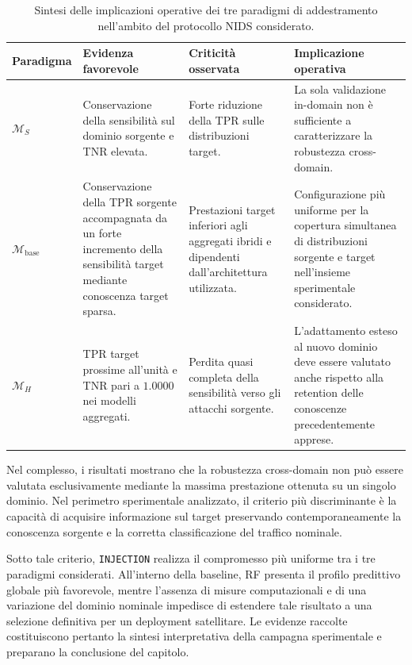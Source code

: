 \begin{table}[H]
    \centering
    \caption{Sintesi delle implicazioni operative dei tre paradigmi di addestramento nell'ambito del protocollo NIDS considerato.}
    \label{tab:cap5_operational_summary}
    \footnotesize
    \begin{tabularx}{\textwidth}{l >{\raggedright\arraybackslash}X >{\raggedright\arraybackslash}X >{\raggedright\arraybackslash}X}
        \toprule
        \textbf{Paradigma} & \textbf{Evidenza favorevole} & \textbf{Criticità osservata} & \textbf{Implicazione operativa} \\
        \midrule
        $\mathcal{M}_{S}$
        & Conservazione della sensibilità sul dominio sorgente e TNR elevata.
        & Forte riduzione della TPR sulle distribuzioni target.
        & La sola validazione in-domain non è sufficiente a caratterizzare la robustezza cross-domain. \\
        \addlinespace
        $\mathcal{M}_{\mathrm{base}}$
        & Conservazione della TPR sorgente accompagnata da un forte incremento della sensibilità target mediante conoscenza target sparsa.
        & Prestazioni target inferiori agli aggregati ibridi e dipendenti dall'architettura utilizzata.
        & Configurazione più uniforme per la copertura simultanea di distribuzioni sorgente e target nell'insieme sperimentale considerato. \\
        \addlinespace
        $\mathcal{M}_{H}$
        & TPR target prossime all'unità e TNR pari a $1.0000$ nei modelli aggregati.
        & Perdita quasi completa della sensibilità verso gli attacchi sorgente.
        & L'adattamento esteso al nuovo dominio deve essere valutato anche rispetto alla retention delle conoscenze precedentemente apprese. \\
        \bottomrule
    \end{tabularx}
\end{table}

Nel complesso, i risultati mostrano che la robustezza cross-domain non può essere valutata esclusivamente mediante la massima prestazione ottenuta su un singolo dominio. 
Nel perimetro sperimentale analizzato, il criterio più discriminante è la capacità di acquisire informazione sul target preservando contemporaneamente la conoscenza sorgente e la corretta classificazione del traffico nominale.

Sotto tale criterio, \texttt{INJECTION} realizza il compromesso più uniforme tra i tre paradigmi considerati. 
All'interno della baseline, RF presenta il profilo predittivo globale più favorevole, mentre l'assenza di misure computazionali e di una variazione del dominio nominale impedisce di estendere tale risultato a una selezione definitiva per un deployment satellitare. 
Le evidenze raccolte costituiscono pertanto la sintesi interpretativa della campagna sperimentale e preparano la conclusione del capitolo.



